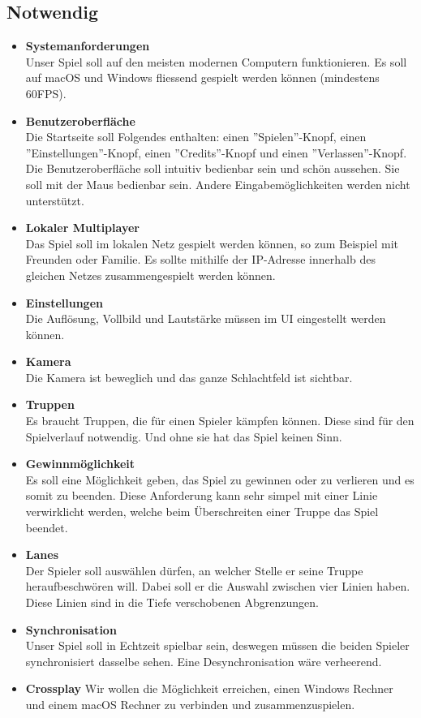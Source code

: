 \subsection{Notwendig}
\begin{itemize}
    \item \textbf{Systemanforderungen} \\
        Unser Spiel soll auf den meisten modernen Computern funktionieren. Es soll auf macOS und
        Windows fliessend gespielt werden können (mindestens 60FPS).
    \item \textbf{Benutzeroberfläche} \\
        Die Startseite soll Folgendes enthalten: einen ''Spielen''-Knopf, einen ''Einstellungen''-Knopf, einen
        ''Credits''-Knopf und einen ''Verlassen''-Knopf. Die Benutzeroberfläche soll intuitiv bedienbar sein und
        schön aussehen. Sie soll mit der Maus bedienbar sein. Andere Eingabemöglichkeiten
        werden nicht unterstützt.
    \item \textbf{Lokaler Multiplayer} \\
        Das Spiel soll im lokalen Netz gespielt werden können, so zum Beispiel mit Freunden oder Familie.
        Es sollte mithilfe der IP-Adresse innerhalb des gleichen Netzes zusammengespielt werden können.
    \item \textbf{Einstellungen} \\
        Die Auflösung, Vollbild und Lautstärke müssen im UI eingestellt werden können.
    \item \textbf{Kamera} \\
        Die Kamera ist beweglich und das ganze Schlachtfeld ist sichtbar.
    \item \textbf{Truppen} \\
        Es braucht Truppen, die für einen Spieler kämpfen können. Diese sind für den Spielverlauf notwendig.
        Und ohne sie hat das Spiel keinen Sinn.
    \item \textbf{Gewinnmöglichkeit} \\
        Es soll eine Möglichkeit geben, das Spiel zu gewinnen oder zu verlieren und es somit zu beenden. Diese Anforderung kann sehr simpel
        mit einer Linie verwirklicht werden, welche beim Überschreiten einer Truppe das Spiel beendet.
    \item \textbf{Lanes} \\
        Der Spieler soll auswählen dürfen, an welcher Stelle er seine Truppe heraufbeschwören will. Dabei soll er die Auswahl zwischen vier Linien haben. Diese Linien sind in die Tiefe verschobenen Abgrenzungen.
    \item \textbf{Synchronisation} \\
        Unser Spiel soll in Echtzeit spielbar sein, deswegen müssen die beiden Spieler synchronisiert dasselbe sehen. Eine Desynchronisation wäre verheerend. 
    \item \textbf{Crossplay}
        Wir wollen die Möglichkeit erreichen, einen Windows Rechner und einem macOS Rechner zu verbinden und zusammenzuspielen.
\end{itemize}

